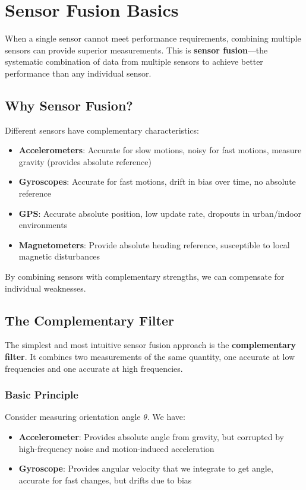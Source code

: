 \section{Sensor Fusion Basics}
\label{sec:sensor_fusion}

When a single sensor cannot meet performance requirements, combining multiple sensors can provide superior measurements. This is \textbf{sensor fusion}---the systematic combination of data from multiple sensors to achieve better performance than any individual sensor.

\subsection{Why Sensor Fusion?}

Different sensors have complementary characteristics:
\begin{itemize}
    \item \textbf{Accelerometers}: Accurate for slow motions, noisy for fast motions, measure gravity (provides absolute reference)
    \item \textbf{Gyroscopes}: Accurate for fast motions, drift in bias over time, no absolute reference
    \item \textbf{GPS}: Accurate absolute position, low update rate, dropouts in urban/indoor environments
    \item \textbf{Magnetometers}: Provide absolute heading reference, susceptible to local magnetic disturbances
\end{itemize}

By combining sensors with complementary strengths, we can compensate for individual weaknesses.

\subsection{The Complementary Filter}

The simplest and most intuitive sensor fusion approach is the \textbf{complementary filter}. It combines two measurements of the same quantity, one accurate at low frequencies and one accurate at high frequencies.

\subsubsection{Basic Principle}

Consider measuring orientation angle $\theta$. We have:
\begin{itemize}
    \item \textbf{Accelerometer}: Provides absolute angle from gravity, but corrupted by high-frequency noise and motion-induced acceleration
    \item \textbf{Gyroscope}: Provides angular velocity that we integrate to get angle, accurate for fast changes, but drifts due to bias
\end{itemize}

